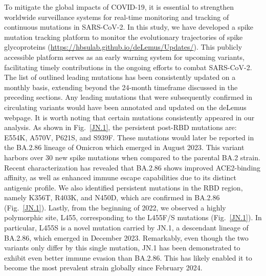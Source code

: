 \documentclass[aps,prl,amsmath,amssymb,floatfix,twocolumn, amsmath, superscriptaddress, onecolumn]{revtex4}
\newcommand{\fref}[1]{Fig.~\ref{#1}}%
\begin{document}
To mitigate the global impacts of COVID-19, it is essential to strengthen worldwide surveillance systems for real-time monitoring and tracking of continuous mutations in SARS-CoV-2. In this study, we have developed a spike mutation tracking platform to monitor the evolutionary trajectories of spike glycoproteins (\href{https://hbsulab.github.io/deLemus/Updates/}{https://hbsulab.github.io/deLemus/Updates/}). This publicly accessible platform serves as an early warning system for upcoming variants, facilitating timely contributions in the ongoing efforts to combat SARS-CoV-2. The list of outlined leading mutations has been consistently updated on a monthly basis, extending beyond the 24-month timeframe discussed in the preceding sections. Any leading mutations that were subsequently confirmed in circulating variants would have been annotated and updated on the deLemus webpage. It is worth noting that certain mutations consistently appeared in our analysis. As shown in \fref{JN.1}, the persistent post-RBD mutations are: E554K, A570V, P621S, and S939F. These mutations would later be reported in the BA.2.86 lineage of Omicron which emerged in August 2023. This variant harbors over 30 new spike mutations when compared to the parental BA.2 strain.\cite{10.1136/bmj.p1964, 10.1016/S1473-3099(23)00575-3} Recent characterization has revealed that BA.2.86 shows improved ACE2-binding affinity,\cite{10.1038/s41586-023-06750-w} as well as enhanced immune escape capabilities due to its distinct antigenic profile.\cite{10.1016/S1473-3099(23)00573-X, 10.1016/S1473-3099(23)00575-3, 10.1016/j.vaccine.2023.10.051, 10.1038/s41467-023-43703-3} We also identified persistent mutations in the RBD region, namely K356T, R403K, and N450D, which are confirmed in BA.2.86 (\fref{JN.1}). Lastly, from the beginning of 2022, we observed a highly polymorphic site, L455, corresponding to the L455F/S mutations (\fref{JN.1}). In particular, L455S is a novel mutation carried by JN.1, a descendant lineage of BA.2.86, which emerged in December 2023. Remarkably, even though the two variants only differ by this single mutation, JN.1 has been demonstrated to exhibit even better immune evasion than BA.2.86.\cite{Yang2023, Yamasoba2023} This has likely enabled it to become the most prevalent strain globally since February 2024.\cite{WHO_jn1}
\end{document}
